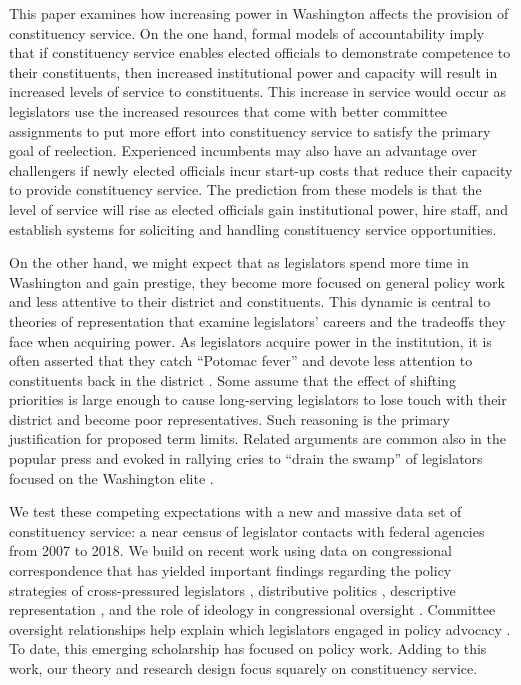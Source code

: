 \documentclass[12pt]{article}
\begin{document}
This paper examines how increasing power in Washington affects the provision of constituency service. On the one hand, formal models of accountability \citep{AshworthBuenodeMesquita2006} imply that if constituency service enables elected officials to demonstrate competence to their constituents, then increased institutional power and capacity will result in increased levels of service to constituents. This increase in service would occur as legislators use the increased resources that come with better committee assignments to put more effort into constituency service to satisfy the primary goal of reelection. Experienced incumbents may also have an advantage over challengers if newly elected officials incur start-up costs that reduce their capacity to provide constituency service. The prediction from these models is that the level of service will rise as elected officials gain institutional power, hire staff, and establish systems for soliciting and handling constituency service opportunities.

On the other hand, we might expect that as legislators spend more time in Washington and gain prestige, they become more focused on general policy work and less attentive to their district and constituents. This dynamic is central to theories of representation that examine legislators' careers and the tradeoffs they face when acquiring power. As legislators acquire power in the institution, it is often asserted that they catch ``Potomac fever'' and devote less attention to constituents back in the district \citep{Fenno1978}. Some assume that the effect of shifting priorities is large enough to cause long-serving legislators to lose touch with their district and become poor representatives. Such reasoning is the primary justification for proposed term limits. Related arguments are common also in the popular press \citep{Edwards2005} and evoked in rallying cries to ``drain the swamp'' of legislators focused on the Washington elite \citep{Rosenblatt2016}.

We test these competing expectations with a new and massive data set of constituency service: a near census of legislator contacts with federal agencies from 2007 to 2018. We build on recent work using data on congressional correspondence that has yielded important findings regarding the policy strategies of cross-pressured legislators \citep{Ritchie2017}, distributive politics \citep{MillsKalafHuges2015}, descriptive representation \citep{LowandeRitchieLauterbach2018}, and the role of ideology in congressional oversight \citep{Lowande2018JOP}. Committee oversight relationships help explain which legislators engaged in policy advocacy \citep{Ritchie2017,Lowande2018JOP}.
To date, this emerging scholarship has focused on policy work. 
Adding to this work, our theory and research design focus squarely on constituency service.
\end{document}

